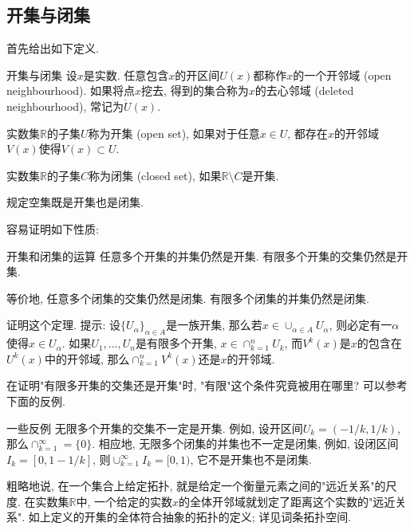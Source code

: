 

\subsection{开集与闭集}

首先给出如下定义.

\begin{definition}{开集与闭集}
设$x$是实数. 任意包含$x$的开区间$U(x)$都称作$x$的一个开邻域 (open neighbourhood). 如果将点$x$挖去, 得到的集合称为$x$的去心邻域 (deleted neighbourhood), 常记为$\mathring U(x)$.

实数集$\mathbb{R}$的子集$U$称为开集 (open set), 如果对于任意$x\in U$, 都存在$x$的开邻域$V(x)$使得$V(x)\subset U$. 

实数集$\mathbb{R}$的子集$C$称为闭集 (closed set), 如果$\mathbb{R}\setminus C$是开集.

规定空集既是开集也是闭集.
\end{definition}

容易证明如下性质:

\begin{theorem}{开集和闭集的运算}
任意多个开集的并集仍然是开集. 有限多个开集的交集仍然是开集.

等价地, 任意多个闭集的交集仍然是闭集. 有限多个闭集的并集仍然是闭集.
\end{theorem}

\begin{exercise}{}
证明这个定理. 提示: 设$\{U_\alpha\}_{\alpha\in A}$是一族开集, 那么若$x\in \cup_{\alpha\in A}U_\alpha$, 则必定有一$\alpha$使得$x\in U_\alpha$. 如果$U_1,...,U_n$是有限多个开集, $x\in\cap_{k=1}^nU_k$, 而$V^k(x)$是$x$的包含在$U^k(x)$中的开邻域, 那么$\cap_{k=1}^nV^k(x)$还是$x$的开邻域.
\end{exercise}

\begin{exercise}{}
在证明"有限多开集的交集还是开集"时, "有限"这个条件究竟被用在哪里? 可以参考下面的反例.
\end{exercise}

\begin{example}{一些反例}
无限多个开集的交集不一定是开集. 例如, 设开区间$U_k=(-1/k,1/k)$, 那么$\cap_{k=1}^\infty=\{0\}$. 相应地, 无限多个闭集的并集也不一定是闭集, 例如, 设闭区间$I_k=[0,1-1/k]$, 则$\cup_{k=1}^\infty I_k=[0,1)$, 它不是开集也不是闭集.
\end{example}

粗略地说, 在一个集合上给定拓扑, 就是给定一个衡量元素之间的"远近关系"的尺度. 在实数集$\mathbb{R}$中, 一个给定的实数$x$的全体开邻域就划定了距离这个实数的"远近关系". 如上定义的开集的全体符合抽象的拓扑的定义; 详见词条拓扑空间.

